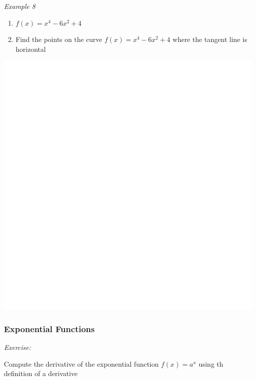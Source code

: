 \documentclass[]{book}
\begin{document}
\newpage

\emph{Example 8}

\begin{enumerate}
\def\labelenumi{\alph{enumi})}
\item
  \(f(x)=x^4 - 6x^2+4\)
\item
  Find the points on the curve \(f(x)=x^4-6x^2+4\) where the tangent line is horizontal
\end{enumerate}

\begin{center}\includegraphics[width=1\linewidth]{figure/LB13-1} \end{center}

\newpage

\hypertarget{exponential-functions}{%
\subsubsection{Exponential Functions}\label{exponential-functions}}

\emph{Exercise:}

Compute the derivative of the exponential function \(f(x) = a^x\) using th definition of a derivative
\end{document}
